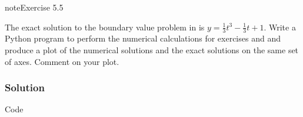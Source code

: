 \documentclass[letterpaper,10pt,english]{jupyterBook}
\begin{document}
\begin{sphinxadmonition}{note}{Exercise 5.5}

\sphinxAtStartPar
The exact solution to the boundary value problem in {\hyperref[\detokenize{5_BVPs/5.4_BVP_exercises:ex5-2}]{}} is \(y = \frac{1}{3} t^3 - \frac{1}{3} t + 1\). Write a Python program to perform the numerical calculations for exercises {\hyperref[\detokenize{5_BVPs/5.4_BVP_exercises:ex5-3}]{}} and {\hyperref[\detokenize{5_BVPs/5.4_BVP_exercises:ex5-4}]{}} and produce a plot of the numerical solutions and the exact solutions on the same set of axes. Comment on your plot.
\subsubsection*{Solution}

\sphinxAtStartPar
Code

\begin{sphinxVerbatim}[commandchars=\\\{\}]
   
   

    
      \PYG{p}{[}\PYG{p}{]}  \PYG{p}{[}\PYG{p}{]}  
      
          
         
    \PYG{p}{[}\PYG{p}{]}  
       
        \PYG{p}{[}\PYG{p}{]}  \PYG{p}{[}\PYG{p}{]}    \PYG{p}{[}\PYG{p}{]} \PYG{p}{[}\PYG{p}{]}
        

\end{sphinxVerbatim}
\end{sphinxadmonition}
\end{document}

